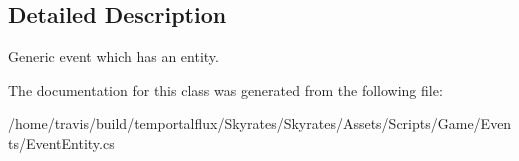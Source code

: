 \subsection{Detailed Description}
Generic event which has an entity. 



The documentation for this class was generated from the following file\-:\begin{DoxyCompactItemize}
\item 
/home/travis/build/temportalflux/\-Skyrates/\-Skyrates/\-Assets/\-Scripts/\-Game/\-Events/Event\-Entity.\-cs\end{DoxyCompactItemize}
